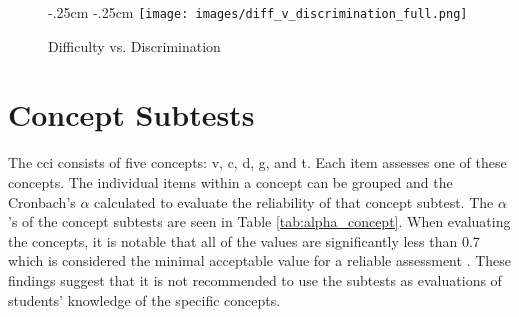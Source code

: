 \begin{table}[!htbp]
\caption{Difficulty and Discrimination of Each Item}
\centering
{}
\label{tab:diff_v_discrimination}
\end{table}




\begin{figure}[ht]
    \begin{center}
    \advance\leftskip-.25cm
    \advance\rightskip-.25cm
    \texttt{[image: images/diff\_v\_discrimination\_full.png]}
    \caption{Difficulty vs. Discrimination}
    \label{fig:dif_disc}
\end{center}
\end{figure}



\FloatBarrier
\section{Concept Subtests}
The \gls{cci} consists of five concepts: \gls{v}, \gls{c}, \gls{d}, \gls{g}, and \gls{t}. Each item assesses one of these concepts. The individual items within a concept can be grouped and the Cronbach's $\alpha$ calculated to evaluate the reliability of that concept subtest. The $\alpha$'s of the concept subtests are seen in Table \ref{tab:alpha_concept}. When evaluating the concepts, it is notable that all of the values are significantly less than 0.7 which is considered the minimal acceptable value for a reliable assessment \cite{panayiotis}. These findings suggest that it is not recommended to use the subtests as evaluations of students' knowledge of the specific concepts. 

